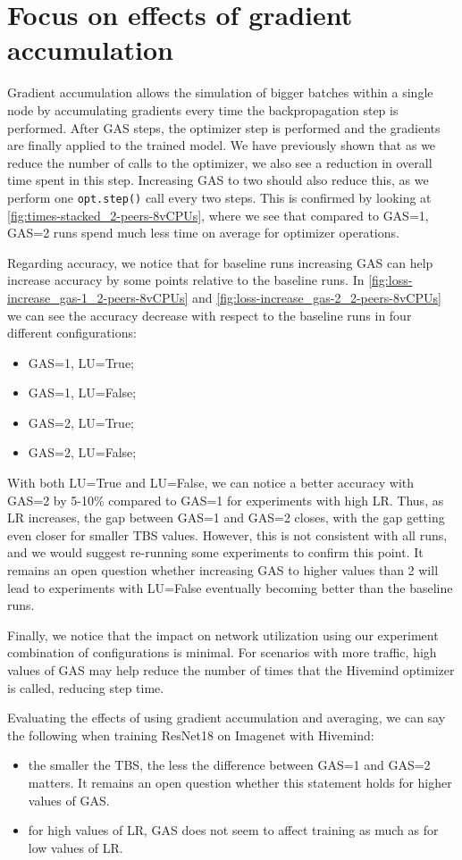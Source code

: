 \section{Focus on effects of gradient accumulation}\label{sec:focus-gradient-acc}

Gradient accumulation allows the simulation of bigger batches within a single node by accumulating gradients every time the backpropagation step is performed.
After GAS steps, the optimizer step is performed and the gradients are finally applied to the trained model.
We have previously shown that as we reduce the number of calls to the optimizer, we also see a reduction in overall time spent in this step.
Increasing GAS to two should also reduce this, as we perform one \texttt{opt.step()} call every two steps.
This is confirmed by looking at \autoref{fig:times-stacked_2-peers-8vCPUs}, where we see that compared to GAS=1, GAS=2 runs spend much less time on average for optimizer operations.

Regarding accuracy, we notice that for baseline runs increasing GAS can help increase accuracy by some points relative to the baseline runs.
In \autoref{fig:loss-increase_gas-1_2-peers-8vCPUs} and \autoref{fig:loss-increase_gas-2_2-peers-8vCPUs} we can see the accuracy decrease with respect to the baseline runs in four different configurations:
\begin{itemize}
    \item GAS=1, LU=True;
    \item GAS=1, LU=False;
    \item GAS=2, LU=True;
    \item GAS=2, LU=False;
\end{itemize}

With both LU=True and LU=False, we can notice a better accuracy with GAS=2 by 5-10\% compared to GAS=1 for experiments with high LR.
Thus, as LR increases, the gap between GAS=1 and GAS=2 closes, with the gap getting even closer for smaller TBS values.
However, this is not consistent with all runs, and we would suggest re-running some experiments to confirm this point.
It remains an open question whether increasing GAS to higher values than 2 will lead to experiments with LU=False eventually becoming better than the baseline runs.

Finally, we notice that the impact on network utilization using our experiment combination of configurations is minimal.
For scenarios with more traffic, high values of GAS may help reduce the number of times that the Hivemind optimizer is called, reducing step time.

Evaluating the effects of using gradient accumulation and averaging, we can say the following when training ResNet18 on Imagenet with Hivemind:
\begin{itemize}
    \item the smaller the TBS, the less the difference between GAS=1 and GAS=2 matters.
          It remains an open question whether this statement holds for higher values of GAS.
    \item for high values of LR, GAS does not seem to affect training as much as for low values of LR.
\end{itemize}
